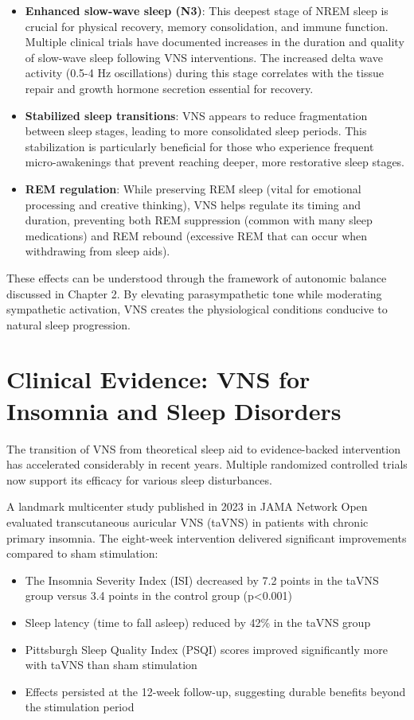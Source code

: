 \documentclass[
  Letterpaper,
]{scrbook}
\providecommand{\tightlist}{%
  \setlength{\itemsep}{0pt}\setlength{\parskip}{0pt}}\usepackage{longtable,booktabs,array}
\begin{document}
\begin{itemize}
\item
  \textbf{Enhanced slow-wave sleep (N3)}: This deepest stage of NREM
  sleep is crucial for physical recovery, memory consolidation, and
  immune function. Multiple clinical trials have documented increases in
  the duration and quality of slow-wave sleep following VNS
  interventions. The increased delta wave activity (0.5-4 Hz
  oscillations) during this stage correlates with the tissue repair and
  growth hormone secretion essential for recovery.
\item
  \textbf{Stabilized sleep transitions}: VNS appears to reduce
  fragmentation between sleep stages, leading to more consolidated sleep
  periods. This stabilization is particularly beneficial for those who
  experience frequent micro-awakenings that prevent reaching deeper,
  more restorative sleep stages.
\item
  \textbf{REM regulation}: While preserving REM sleep (vital for
  emotional processing and creative thinking), VNS helps regulate its
  timing and duration, preventing both REM suppression (common with many
  sleep medications) and REM rebound (excessive REM that can occur when
  withdrawing from sleep aids).
\end{itemize}

These effects can be understood through the framework of autonomic
balance discussed in Chapter 2. By elevating parasympathetic tone while
moderating sympathetic activation, VNS creates the physiological
conditions conducive to natural sleep progression.

\section{Clinical Evidence: VNS for Insomnia and Sleep
Disorders}\label{clinical-evidence-vns-for-insomnia-and-sleep-disorders}

The transition of VNS from theoretical sleep aid to evidence-backed
intervention has accelerated considerably in recent years. Multiple
randomized controlled trials now support its efficacy for various sleep
disturbances.

A landmark multicenter study published in 2023 in JAMA Network Open
evaluated transcutaneous auricular VNS (taVNS) in patients with chronic
primary insomnia. The eight-week intervention delivered significant
improvements compared to sham stimulation:

\begin{itemize}
\tightlist
\item
  The Insomnia Severity Index (ISI) decreased by 7.2 points in the taVNS
  group versus 3.4 points in the control group (p\textless0.001)
\item
  Sleep latency (time to fall asleep) reduced by 42\% in the taVNS group
\item
  Pittsburgh Sleep Quality Index (PSQI) scores improved significantly
  more with taVNS than sham stimulation
\item
  Effects persisted at the 12-week follow-up, suggesting durable
  benefits beyond the stimulation period
\end{itemize}
\end{document}
